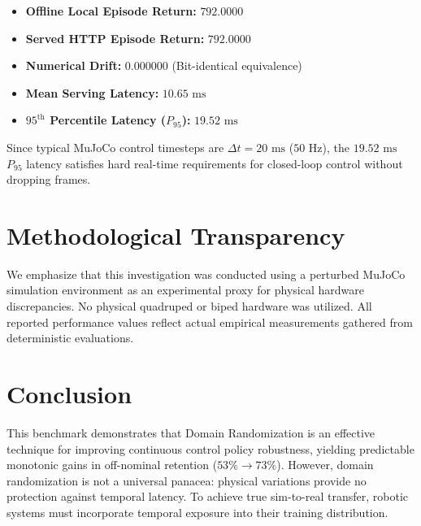 \documentclass[conference]{IEEEtran}
\begin{document}
\begin{itemize}
    \item \textbf{Offline Local Episode Return:} $792.0000$
    \item \textbf{Served HTTP Episode Return:} $792.0000$
    \item \textbf{Numerical Drift:} $\mathbf{0.000000}$ (Bit-identical equivalence)
    \item \textbf{Mean Serving Latency:} $10.65\text{ ms}$
    \item \textbf{$95^{\text{th}}$ Percentile Latency ($P_{95}$):} $19.52\text{ ms}$
\end{itemize}

Since typical MuJoCo control timesteps are $\Delta t = 20\text{ ms}$ ($50\text{ Hz}$), the $19.52\text{ ms}$ $P_{95}$ latency satisfies hard real-time requirements for closed-loop control without dropping frames.

\section{Methodological Transparency}
We emphasize that this investigation was conducted using a perturbed MuJoCo simulation environment as an experimental proxy for physical hardware discrepancies. No physical quadruped or biped hardware was utilized. All reported performance values reflect actual empirical measurements gathered from deterministic evaluations.

\section{Conclusion}
This benchmark demonstrates that Domain Randomization is an effective technique for improving continuous control policy robustness, yielding predictable monotonic gains in off-nominal retention ($53\% \rightarrow 73\%$). However, domain randomization is not a universal panacea: physical variations provide no protection against temporal latency. To achieve true sim-to-real transfer, robotic systems must incorporate temporal exposure into their training distribution.



\end{document}

